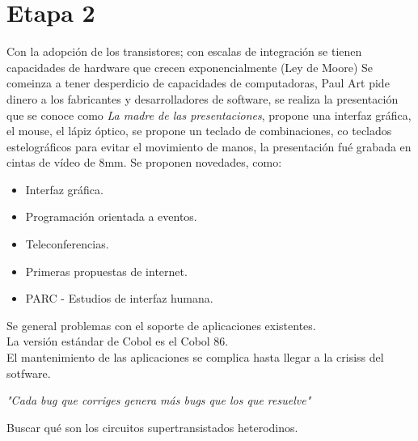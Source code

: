 \chapter{Etapa 2}
Con la adopci\'{o}n de los transistores; con escalas de integraci\'{o}n se tienen capacidades de hardware que crecen exponencialmente (Ley de Moore)
Se comeinza a tener desperdicio de capacidades de computadoras, Paul Art pide dinero a los fabricantes y desarrolladores de software, se realiza la presentaci\'{o}n que se conoce como \textit{La madre de las presentaciones}, propone una interfaz gr\'{a}fica, el mouse, el l\'{a}piz \'{o}ptico, se propone un teclado de combinaciones, co teclados estelogr\'{a}ficos para evitar el movimiento de manos, la presentaci\'{o}n fu\'{e} grabada en cintas de v\'{i}deo de 8mm.
Se proponen novedades, como:
\begin{itemize}
	\item Interfaz gr\'{a}fica.
	\item Programaci\'{o}n orientada a eventos.
	\item Teleconferencias.
	\item Primeras propuestas de internet.
	\item PARC - Estudios de interfaz humana.
\end{itemize}
Se general problemas con el soporte de aplicaciones existentes.\\
La versi\'{o}n est\'{a}ndar de Cobol es el Cobol 86.\\
El mantenimiento de las aplicaciones se complica hasta llegar a la crisiss del sotfware.\\
\begin{center}
	\textit{"Cada bug que corriges genera m\'{a}s bugs que los que resuelve"}
\end{center}


Buscar qu\'{e} son los circuitos supertransistados heterodinos.\\
